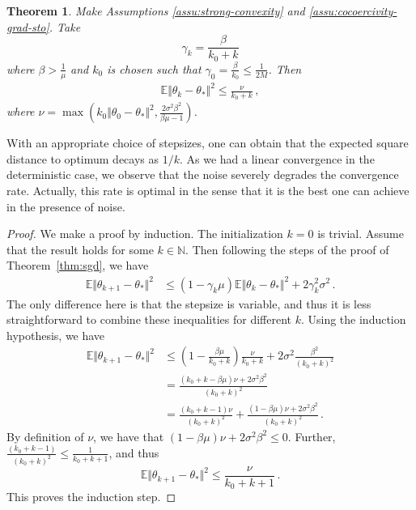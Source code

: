\documentclass[11pt,reqno]{article}
\newcommand{\N}{\mathbb{N}}
\newcommand{\E}{\mathbb{E}}
\renewcommand{\leq}{\leqslant}
\numberwithin{equation}{section}
\theoremstyle{plain}
\newtheorem{thm}[assumption]{Theorem}
\theoremstyle{definition}
\theoremstyle{remark}
\begin{document}
\begin{thm}
	\label{thm:sgd-decay}
	Make Assumptions \ref{assu:strong-convexity} and \ref{assu:cocoercivity-grad-sto}. Take
	\begin{equation*}
		\gamma_k = \frac{\beta}{k_0 + k} 
	\end{equation*}
	where $\beta > \frac{1}{\mu}$ and $k_0$ is chosen such that $\gamma_0 = \frac{\beta}{k_0} \leq \frac{1}{2M}$. Then 
	\begin{align*}
		\E \Vert \theta_k - \theta_* \Vert^2 \leq \frac{\nu}{k_0 + k} \, ,
	\end{align*}
	where $\nu = \max\left(k_0 \Vert \theta_0 - \theta_* \Vert^2, \frac{2\sigma^2\beta^2}{\beta\mu-1}\right)$.
\end{thm}
With an appropriate choice of stepsizes, one can obtain that the expected square distance to optimum decays as $1/k$. As we had a linear convergence in the deterministic case, we observe that the noise severely degrades the convergence rate. Actually, this rate is optimal in the sense that it is the best one can achieve in the presence of noise.

\begin{proof}
	We make a proof by induction. The initialization $k=0$ is trivial. Assume that the result holds for some $k \in \N$. Then following the steps of the proof of Theorem~\ref{thm:sgd}, we have
	\begin{align*}
		\E \Vert \theta_{k+1} - \theta_* \Vert^2  &\leq (1-\gamma_k\mu ) \E \Vert \theta_k - \theta_* \Vert^2  + 2\gamma_k^2 \sigma^2 \, .
	\end{align*}
	The only difference here is that the stepsize is variable, and thus it is less straightforward to combine these inequalities for different $k$. Using the induction hypothesis, we have
	\begin{align*}
		\E \Vert \theta_{k+1} - \theta_* \Vert^2  &\leq \left(1-\frac{\beta\mu}{k_0+k} \right) \frac{\nu}{k_0+k}  + 2\sigma^2\frac{\beta^2}{(k_0+k)^2} \\
		&= \frac{(k_0+k-\beta\mu)\nu + 2\sigma^2 \beta^2}{(k_0+k)^2} \\
		&= \frac{(k_0+k-1)\nu}{(k_0+k)^2} + \frac{(1-\beta\mu)\nu+2\sigma^2\beta^2}{(k_0+k)^2} \, .
	\end{align*}
	By definition of $\nu$, we have that $(1-\beta\mu)\nu+2\sigma^2\beta^2 \leq 0$. Further, $\frac{(k_0+k-1)}{(k_0+k)^2} \leq \frac{1}{k_0+k+1}$, and thus
	\begin{equation*}
		\E \Vert \theta_{k+1} - \theta_* \Vert^2 \leq \frac{\nu}{k_0+k+1} \, .
	\end{equation*}
This proves the induction step.
\end{proof}
\end{document}
